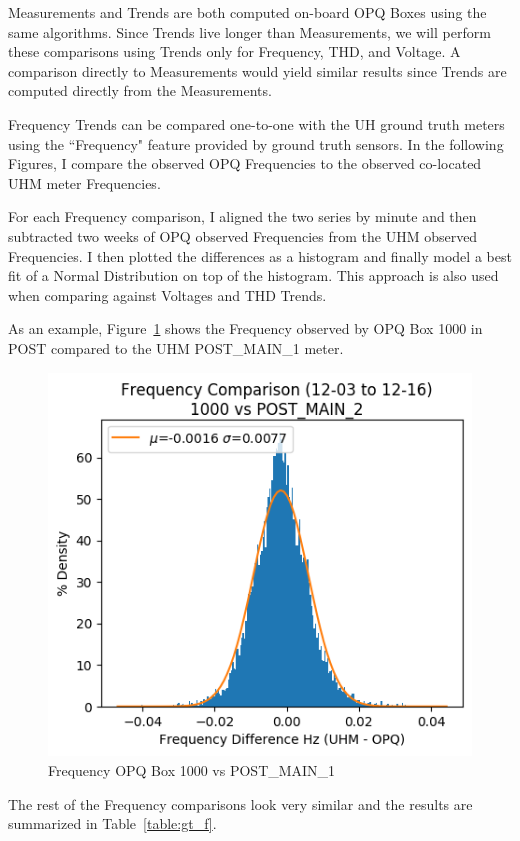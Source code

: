 Measurements and Trends are both computed on-board OPQ Boxes using the same algorithms. Since Trends live longer than Measurements, we will perform these comparisons using Trends only for Frequency, THD, and Voltage. A comparison directly to Measurements would yield similar results since Trends are computed directly from the Measurements.

Frequency Trends can be compared one-to-one with the UH ground truth meters using the ``Frequency" feature provided by ground truth sensors. In the following Figures, I compare the observed OPQ Frequencies to the observed co-located UHM meter Frequencies.

For each Frequency comparison, I aligned the two series by minute and then subtracted two weeks of OPQ observed Frequencies from the UHM observed Frequencies. I then plotted the differences as a histogram and finally model a best fit of a Normal Distribution on top of the histogram. This approach is also used when comparing against Voltages and THD Trends.

As an example, Figure~\ref{fig:f_hist} shows the Frequency observed by OPQ Box 1000 in POST compared to the UHM POST\_MAIN\_1 meter.

\begin{figure}[H]
    \centering
    \includegraphics[width=0.75\linewidth]{figures/f_hist_1000_POST_MAIN_2.png}
    \caption{Frequency OPQ Box 1000 vs POST\_MAIN\_1}
    \label{fig:f_hist}
\end{figure}

The rest of the Frequency comparisons look very similar and the results are summarized in Table~\ref{table:gt_f}.

